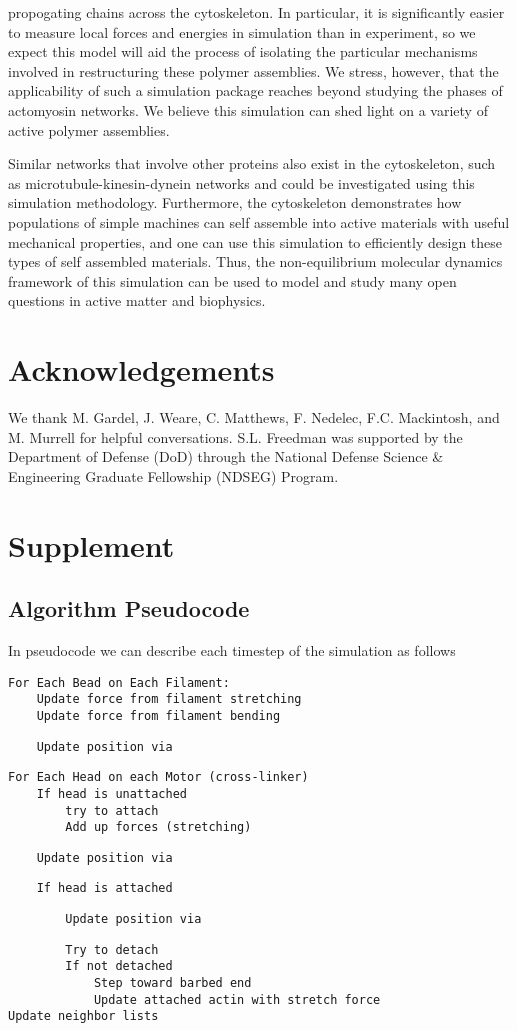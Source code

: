 \documentclass[12pt]{article}
\newcommand{\beginsupplement}{%
  \setcounter{table}{0}
  \renewcommand{\thetable}{S\arabic{table}}%
  \setcounter{figure}{0}
  \renewcommand{\thefigure}{S\arabic{figure}}%
}
\begin{document}
propogating chains across the cytoskeleton. 
In particular, it is significantly easier to measure local forces and energies in simulation than in experiment, 
so we expect this model will aid the process of isolating the particular mechanisms involved in restructuring these
polymer assemblies. We stress, however, that
the applicability of such a simulation package reaches beyond studying the phases of actomyosin networks.  
We believe this simulation can shed light on a variety of active polymer assemblies.
\par
Similar networks that involve other proteins also exist in the
cytoskeleton, such as microtubule-kinesin-dynein networks and could be investigated using this simulation methodology. 
Furthermore, the cytoskeleton demonstrates how populations of simple machines can self assemble into active materials with
useful mechanical properties, and one can use this simulation to efficiently design these types of self assembled
materials. Thus, the non-equilibrium molecular dynamics framework of this simulation can be used to model and study
many open questions in active matter and biophysics. 
\section{Acknowledgements}  
We thank M. Gardel, J. Weare, C. Matthews, F. Nedelec, F.C. Mackintosh, and M. Murrell for helpful conversations. S.L. Freedman
was supported by the Department of Defense (DoD) through the National Defense Science \& Engineering Graduate Fellowship
(NDSEG) Program.



\beginsupplement
\section{Supplement}
\subsection{Algorithm Pseudocode}
In pseudocode we can describe each timestep of the simulation as follows
\begin{verbatim}
For Each Bead on Each Filament:
    Update force from filament stretching
    Update force from filament bending\end{verbatim}
\verb|    Update position via | \begin{verbatim}
For Each Head on each Motor (cross-linker)
    If head is unattached
        try to attach
        Add up forces (stretching)\end{verbatim}
\verb|    Update position via | \begin{verbatim}
    If head is attached\end{verbatim}
\verb|        Update position via | \begin{verbatim}
        Try to detach
        If not detached 
            Step toward barbed end
            Update attached actin with stretch force
Update neighbor lists
\end{verbatim}
\end{document}
